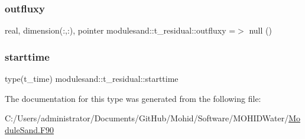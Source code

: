\subsubsection{\texorpdfstring{outfluxy}{outfluxy}}
{\footnotesize\ttfamily real, dimension(\+:,\+:), pointer modulesand\+::t\+\_\+residual\+::outfluxy =$>$ null ()\hspace{0.3cm}{\ttfamily [private]}}

\mbox{\label{structmodulesand_1_1t__residual_ad28ac6ca919edd40b3fd78aa953eee6f}} 
\subsubsection{\texorpdfstring{starttime}{starttime}}
{\footnotesize\ttfamily type(t\+\_\+time) modulesand\+::t\+\_\+residual\+::starttime\hspace{0.3cm}{\ttfamily [private]}}



The documentation for this type was generated from the following file\+:\begin{DoxyCompactItemize}
\item 
C\+:/\+Users/administrator/\+Documents/\+Git\+Hub/\+Mohid/\+Software/\+M\+O\+H\+I\+D\+Water/\mbox{\hyperlink{_module_sand_8_f90}{Module\+Sand.\+F90}}\end{DoxyCompactItemize}
